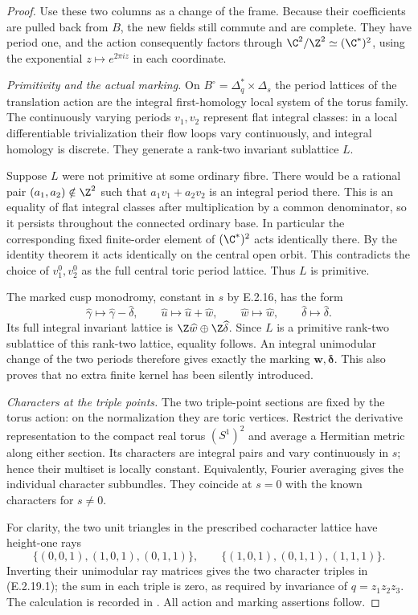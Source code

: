 \begin{proof}
Use these two columns as a
change of the frame.  Because
their coefficients are pulled
back from $B$, the new fields
still commute and are complete.
They have period one, and the
action consequently factors
through
$\C^2/\Z^2\simeq(\C^*)^2$,
using the exponential
$z\mapsto e^{2\pi i z}$
in each coordinate.

\emph{Primitivity and the actual marking.}
On $B^\circ=\Delta_q^*\times\Delta_s$
the period lattices of the
translation action are the
integral first-homology local
system of the torus family.
The continuously varying
periods $v_1,v_2$ represent
flat integral classes: in a
local differentiable
trivialization their flow
loops vary continuously, and
integral homology is discrete.
They generate a rank-two
invariant sublattice $L$.

Suppose $L$ were not primitive
at some ordinary fibre.  There
would be a rational pair
$(a_1,a_2)\notin\Z^2$ such
that $a_1v_1+a_2v_2$ is an
integral period there.  This
is an equality of flat
integral classes after
multiplication by a common
denominator, so it persists
throughout the connected
ordinary base.  In particular
the corresponding fixed
finite-order element of
$(\C^*)^2$ acts identically
there.  By the identity
theorem it acts identically
on the central open orbit.
This contradicts the choice
of $v_1^0,v_2^0$ as the full
central toric period lattice.
Thus $L$ is primitive.

The marked cusp monodromy,
constant in $s$ by E.2.16,
has the form
\[
 \widehat\gamma\longmapsto
       \widehat\gamma-\widehat\delta,
 \qquad
 \widehat u\longmapsto\widehat u+\widehat w,
 \qquad
 \widehat w\longmapsto\widehat w,
 \qquad
 \widehat\delta\longmapsto\widehat\delta.
 \tag{E.2.19.6}
\]
Its full integral invariant
lattice is
$\Z\widehat w\oplus\Z\widehat\delta$.
Since $L$ is a primitive
rank-two sublattice of this
rank-two lattice, equality
follows.  An integral
unimodular change of the two
periods therefore gives
exactly the marking
$\mathbf w,\boldsymbol\delta$.
This also proves that no
extra finite kernel has been
silently introduced.

\emph{Characters at the triple points.}
The two triple-point sections
are fixed by the torus action:
on the normalization they
are toric vertices.  Restrict
the derivative representation
to the compact real torus
$(S^1)^2$ and average a
Hermitian metric along either
section.  Its characters
are integral pairs and
vary continuously in $s$;
hence their multiset is
locally constant.  Equivalently,
Fourier averaging gives the
individual character
subbundles.  They coincide
at $s=0$ with the known
characters for $s\ne0$.

For clarity, the two unit
triangles in the prescribed
cocharacter lattice have
height-one rays
\[
 \{(0,0,1),(1,0,1),(0,1,1)\},
 \qquad
 \{(1,0,1),(0,1,1),(1,1,1)\}.
\]
Inverting their unimodular
ray matrices gives the two
character triples in
(E.2.19.1); the sum in
each triple is zero, as
required by invariance of
$q=z_1z_2z_3$.
The calculation is recorded
in .
All action and marking
assertions follow.
\end{proof}

